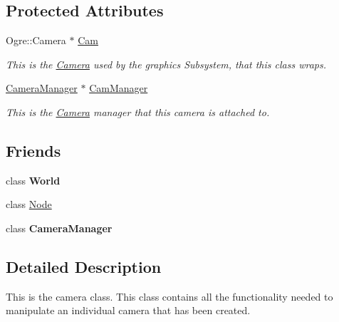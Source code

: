 \subsection*{Protected Attributes}
\begin{DoxyCompactItemize}
\item 
Ogre::Camera $\ast$ \hyperlink{classphys_1_1Camera_a91622148b9b9a9ae1554c828f7e2fc89}{Cam}
\begin{DoxyCompactList}\small\item\em This is the \hyperlink{classphys_1_1Camera}{Camera} used by the graphics Subsystem, that this class wraps. \item\end{DoxyCompactList}\item 
\hyperlink{classphys_1_1CameraManager}{CameraManager} $\ast$ \hyperlink{classphys_1_1Camera_a909203ede748deb1b587a8758ba8cec4}{CamManager}
\begin{DoxyCompactList}\small\item\em This is the \hyperlink{classphys_1_1Camera}{Camera} manager that this camera is attached to. \item\end{DoxyCompactList}\end{DoxyCompactItemize}
\subsection*{Friends}
\begin{DoxyCompactItemize}
\item 
\hypertarget{classphys_1_1Camera_a7b4bcdf992c21ae83363f25df05b1d25}{
class {\bfseries World}}
\label{d9/df8/classphys_1_1Camera_a7b4bcdf992c21ae83363f25df05b1d25}

\item 
class \hyperlink{classphys_1_1Camera_a6db9d28bd448a131448276ee03de1e6d}{Node}
\item 
\hypertarget{classphys_1_1Camera_afae5bf9a900e8c5bc70c9332785e8465}{
class {\bfseries CameraManager}}
\label{d9/df8/classphys_1_1Camera_afae5bf9a900e8c5bc70c9332785e8465}

\end{DoxyCompactItemize}


\subsection{Detailed Description}
This is the camera class. This class contains all the functionality needed to manipulate an individual camera that has been created. 

